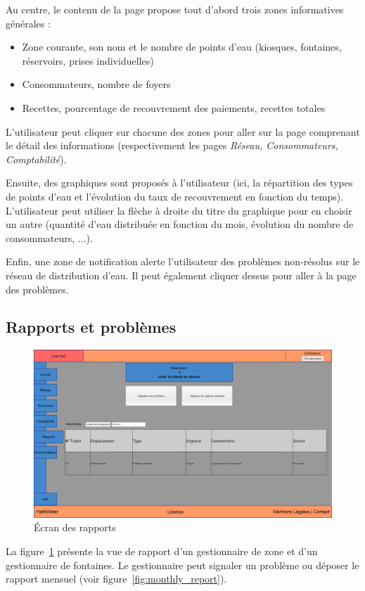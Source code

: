 \documentclass[a4paper, 11pt]{article}
\begin{document}
    Au centre, le contenu de la page propose tout d'abord trois zones informatives générales :
    \begin{itemize}
      \item Zone courante, son nom et le nombre de points d'eau (kiosques, fontaines, réservoirs, prises individuelles)
      \item Consommateurs, nombre de foyers
      \item Recettes, pourcentage de recouvrement des paiements, recettes totales
    \end{itemize}
    L'utilisateur peut cliquer sur chacune des zones pour aller sur la page comprenant le détail des informations (respectivement les pages \emph{Réseau, Consommateurs, Comptabilité}).

    Ensuite, des graphiques sont proposés à l'utilisateur (ici, la répartition des types de points d'eau et l'évolution du taux de recouvrement en fonction du temps). L'utilisateur peut utiliser la flèche à droite du titre du graphique pour en choisir un autre (quantité d'eau distribuée en fonction du mois, évolution du nombre de consommateurs, ...).

    Enfin, une zone de notification alerte l'utilisateur des problèmes non-résolus sur le réseau de distribution d'eau. Il peut également cliquer dessus pour aller à la page des problèmes.

  \subsection{Rapports et problèmes}
    \begin{figure}[H]
        \centering
        \includegraphics[width=.8\textwidth]{Cahier_des_Charges/rapports}
        \caption{\'Ecran des rapports}
        \label{fig:report}
    \end{figure}
    La figure~\ref{fig:report} présente la vue de rapport d'un gestionnaire de zone et d'un gestionnaire de fontaines. Le gestionnaire peut signaler un problème ou déposer le rapport mensuel (voir figure~\ref{fig:monthly_report}).
\end{document}

